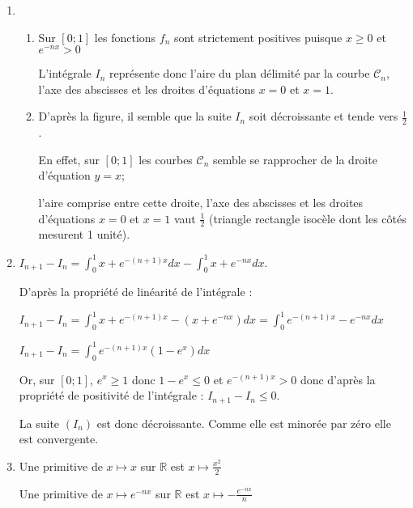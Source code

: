 \begin{corrige}
     \begin{enumerate}
          \item
          \begin{enumerate}[label=\alph*.]
               \item
               Sur $\left[0;1\right]$ les fonctions $f_{n}$ sont strictement positives puisque $x \geqslant 0$ et $e^{-nx} > 0$
               \par
               L'intégrale $I_{n}$ représente donc l'aire du plan délimité par la courbe $\mathscr C_{n}$, l'axe des abscisses et les droites d'équations $x=0$ et $x=1$.
               \item
               D'après la figure, il semble que la suite $I_{n}$ soit décroissante et tende vers $\frac{1}{2}$.
               \par
               En effet, sur $\left[0;1\right]$ les courbes $\mathscr C_{n}$ semble se rapprocher de la droite d'équation $y=x$;
               \par
               l'aire comprise entre cette droite, l'axe des abscisses et les droites d'équations $x=0$ et $x=1$ vaut $\frac{1}{2}$ (triangle rectangle isocèle dont les côtés mesurent 1 unité).
          \end{enumerate}
          \item
          $I_{n+1}-I_{n}=\int_{0}^{1}x+e^{-\left(n+1\right)x}dx-\int_{0}^{1}x+e^{-nx}dx$.
          \par
          D'après la propriété de linéarité de l'intégrale :
          \par
          $I_{n+1}-I_{n}=\int_{0}^{1}x+e^{-\left(n+1\right)x}-\left(x+e^{-nx}\right)dx=\int_{0}^{1}e^{-\left(n+1\right)x}-e^{-nx}dx $
          \par
          $I_{n+1}-I_{n}= \int_{0}^{1}e^{-\left(n+1\right)x} \left(1-e^{x}\right)dx  $
          \par
          Or, sur $\left[0;1\right]$,  $e^{x} \geqslant  1$ donc $1-e^{x}\leqslant 0$ et $e^{-\left(n+1\right)x} > 0$ donc d'après la propriété de positivité de l'intégrale : $I_{n+1}-I_{n} \leqslant  0$.
          \par
          La suite $\left(I_{n}\right)$ est donc décroissante. Comme elle est minorée par zéro elle est convergente.
          \item
          Une primitive de $x\mapsto x$ sur $\mathbb{R}$ est $x\mapsto \frac{x^{2}}{2}$
          \par
          Une primitive de $x\mapsto e^{-nx}$ sur $\mathbb{R}$ est $x\mapsto -\frac{e^{-nx}}{n}$

\end{enumerate}
\end{corrige}
